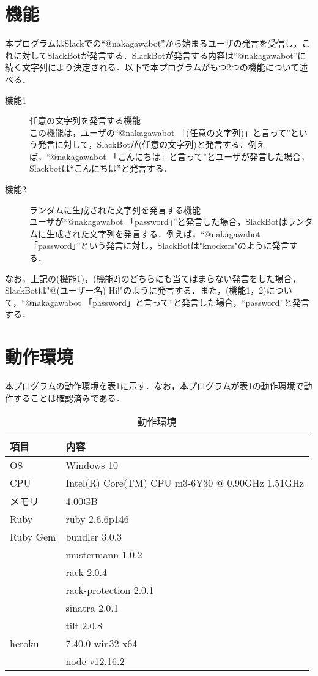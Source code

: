 \documentclass[12pt]{jsarticle}
\begin{document}
\section{機能}\label{sec:function}
本プログラムはSlackでの``@nakagawabot''から始まるユーザの発言を受信し，これに対してSlackBotが発言する．SlackBotが発言する内容は``@nakagawabot''に続く文字列により決定される．以下で本プログラムがもつ2つの機能について述べる．
\begin{description}
\item[機能1] 任意の文字列を発言する機能\\
  この機能は，ユーザの``@nakagawabot 「(任意の文字列)」と言って''という発言に対して，SlackBotが(任意の文字列)と発言する．例えば，``@nakagawabot 「こんにちは」と言って''とユーザが発言した場合，Slackbotは``こんにちは''と発言する．\label{func1}
\item[機能2] ランダムに生成された文字列を発言する機能\\
  ユーザが``@nakagawabot 「password」''と発言した場合，SlackBotはランダムに生成された文字列を発言する．例えば，``@nakagawabot 「password」''という発言に対し，SlackBotは"knockers"のように発言する．
\end{description}
なお，上記の(機能1)，(機能2)のどちらにも当てはまらない発言をした場合，SlackBotは"@(ユーザー名) Hi!"のように発言する．また，(機能1，2)について，``@nakagawabot 「password」と言って''と発言した場合，``password''と発言する．

\section{動作環境}\label{sec:env}
本プログラムの動作環境を表\ref{tab:2}に示す．なお，本プログラムが表\ref{tab:2}の動作環境で動作することは確認済みである．
\begin{table}[h]
  \begin{center}
    \caption{動作環境}\label{tab:2}
    \begin{tabular}{l|l}
      \hline\hline
      \multicolumn{1}{l|}{項目} & \multicolumn{1}{l}{内容}\\
      \hline
      OS & Windows 10 \\
      CPU & Intel(R) Core(TM) CPU m3-6Y30 @ 0.90GHz 1.51GHz\\
      メモリ & 4.00GB\\
      Ruby & ruby 2.6.6p146\\
      Ruby Gem & bundler 3.0.3\\
      & mustermann 1.0.2\\
      & rack 2.0.4\\
      & rack-protection 2.0.1\\
      & sinatra 2.0.1\\
      & tilt 2.0.8\\
      heroku & 7.40.0 win32-x64\\
      & node v12.16.2\\
      \hline
    \end{tabular}
  \end{center}
\end{table}
\end{document}
